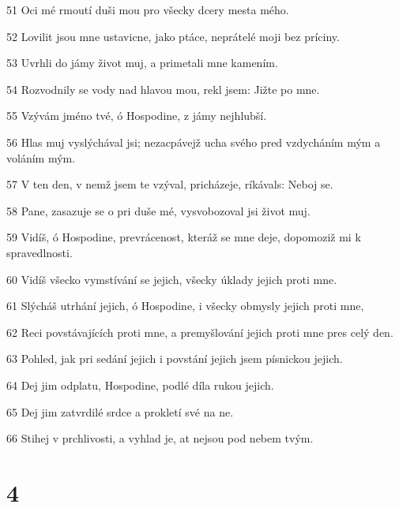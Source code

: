 \par 51 Oci mé rmoutí duši mou pro všecky dcery mesta mého.
\par 52 Lovilit jsou mne ustavicne, jako ptáce, neprátelé moji bez príciny.
\par 53 Uvrhli do jámy život muj, a primetali mne kamením.
\par 54 Rozvodnily se vody nad hlavou mou, rekl jsem: Jižte po mne.
\par 55 Vzývám jméno tvé, ó Hospodine, z jámy nejhlubší.
\par 56 Hlas muj vyslýchával jsi; nezacpávejž ucha svého pred vzdycháním mým a voláním mým.
\par 57 V ten den, v nemž jsem te vzýval, pricházeje, ríkávals: Neboj se.
\par 58 Pane, zasazuje se o pri duše mé, vysvobozoval jsi život muj.
\par 59 Vidíš, ó Hospodine, prevrácenost, kteráž se mne deje, dopomoziž mi k spravedlnosti.
\par 60 Vidíš všecko vymstívání se jejich, všecky úklady jejich proti mne.
\par 61 Slýcháš utrhání jejich, ó Hospodine, i všecky obmysly jejich proti mne,
\par 62 Reci povstávajících proti mne, a premyšlování jejich proti mne pres celý den.
\par 63 Pohled, jak pri sedání jejich i povstání jejich jsem písnickou jejich.
\par 64 Dej jim odplatu, Hospodine, podlé díla rukou jejich.
\par 65 Dej jim zatvrdilé srdce a prokletí své na ne.
\par 66 Stihej v prchlivosti, a vyhlad je, at nejsou pod nebem tvým.

\chapter{4}

